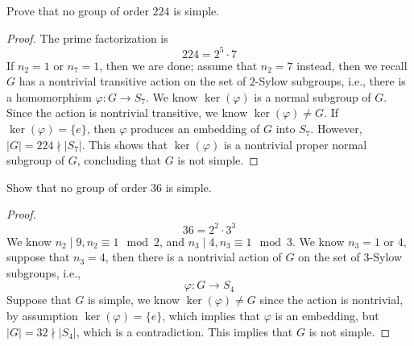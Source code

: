 \begin{prob}[S2007-Q2]
    Prove that no group of order $224$ is simple.
\end{prob}
\begin{proof}
    The prime factorization is 
    \begin{equation*}
        224=2^5\cdot 7
    \end{equation*}
    If $n_2=1$ or $n_7=1$, then we are done; assume that $n_2=7$ instead, then we recall $G$ has a nontrivial transitive action on the set of $2$-Sylow subgroups, i.e., there is a homomorphism $\varphi:G\to S_7$. We know $\ker(\varphi)$ is a normal subgroup of $G$. Since the action is nontrivial transitive, we know $\ker(\varphi)\neq G$. If $\ker(\varphi)=\{e\}$, then $\varphi$ produces an embedding of $G$ into $S_7$. However, $|G|=224\nmid |S_7|$. This shows that $\ker(\varphi)$ is a nontrivial proper normal subgroup of $G$, concluding that $G$ is not simple.
\end{proof}

\begin{prob}[F2008-Q1]
    Show that no group of order $36$ is simple.
\end{prob}
\begin{proof}
    \begin{equation*}
        36=2^2\cdot 3^3
    \end{equation*}
    We know $n_2\mid 9, n_2\equiv 1\mod 2$, and $n_3\mid 4, n_3\equiv 1\mod 3$. We know $n_3=1$ or $4$, suppose that $n_3=4$, then there is a nontrivial action of $G$ on the set of $3$-Sylow subgroups, i.e., 
    \begin{equation*}
        \varphi: G\to S_4
    \end{equation*}
    Suppose that $G$ is simple, we know $\ker(\varphi)\neq G$ since the action is nontrivial, by assumption $\ker(\varphi)=\{e\}$, which implies that $\varphi$ is an embedding, but $|G|=32\nmid |S_4|$, which is a contradiction. This implies that $G$ is not simple.
\end{proof}

